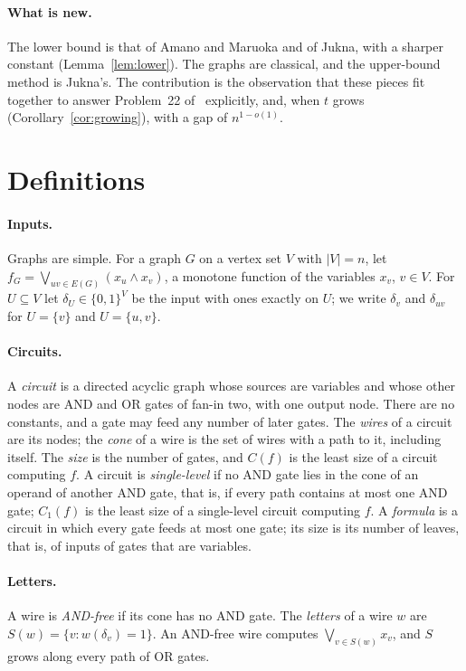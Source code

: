 \documentclass[11pt]{article}
\theoremstyle{definition}
\theoremstyle{remark}
\newcommand{\Cone}{C_1}
\newcommand{\Csize}{C}
\begin{document}
\paragraph{What is new.} The lower bound is that of Amano and Maruoka and of Jukna, with a sharper constant
(Lemma~\ref{lem:lower}). The graphs are classical, and the upper-bound method is Jukna's. The contribution is the
observation that these pieces fit together to answer Problem~22 of~\cite{JukTR} explicitly, and, when $t$ grows
(Corollary~\ref{cor:growing}), with a gap of $n^{1-o(1)}$.

\section{Definitions}

\paragraph{Inputs.} Graphs are simple. For a graph $G$ on a vertex set $V$ with $|V|=n$, let
$f_G=\bigvee_{uv\in E(G)}(x_u\wedge x_v)$, a monotone function of the variables $x_v$, $v\in V$. For $U\subseteq V$
let $\delta_U\in\{0,1\}^V$ be the input with ones exactly on $U$; we write $\delta_v$ and $\delta_{uv}$ for $U=\{v\}$
and $U=\{u,v\}$.

\paragraph{Circuits.} A \emph{circuit} is a directed acyclic graph whose sources are variables and whose other nodes
are AND and OR gates of fan-in two, with one output node. There are no constants, and a gate may feed any number of
later gates. The \emph{wires} of a circuit are its nodes; the \emph{cone} of a wire is the set of wires with a path to
it, including itself. The \emph{size} is the number of gates, and $\Csize(f)$ is the least size of a circuit computing
$f$. A circuit is \emph{single-level} if no AND gate lies in the cone of an operand of another AND gate, that is, if
every path contains at most one AND gate; $\Cone(f)$ is the least size of a single-level circuit computing $f$. A
\emph{formula} is a circuit in which every gate feeds at most one gate; its size is its number of leaves, that is, of inputs of gates that are variables.

\paragraph{Letters.} A wire is \emph{AND-free} if its cone has no AND gate. The \emph{letters} of a wire $w$ are
$S(w)=\{v: w(\delta_v)=1\}$. An AND-free wire computes $\bigvee_{v\in S(w)}x_v$, and $S$ grows along every path of OR
gates.
\end{document}
